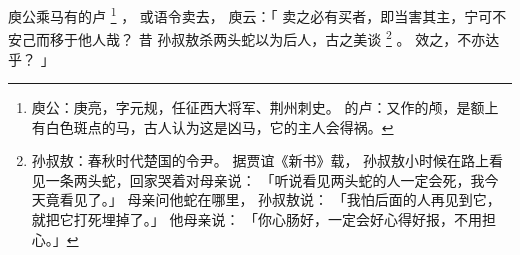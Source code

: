 
\switchcolumn*[\section{}]

庾公乘马有的卢%
\footnote{%
    庾公：庚亮，字元规，任征西大将军、荆州刺史。
    的卢：又作的颅，是额上有白色斑点的马，古人认为这是凶马，它的主人会得祸。
}%
，
或语令卖去，
庾云：「
    卖之必有买者，即当害其主，宁可不安己而移于他人哉？
    昔
    孙叔敖杀两头蛇以为后人，古之美谈%
    \footnote{%
        孙叔敖：春秋时代楚国的令尹。
                据贾谊《新书》载，
                孙叔敖小时候在路上看见一条两头蛇，回家哭着对母亲说：
                「听说看见两头蛇的人一定会死，我今天竟看见了。」
                母亲问他蛇在哪里，
                孙叔敖说：
                「我怕后面的人再见到它，就把它打死埋掉了。」
                他母亲说：
                「你心肠好，一定会好心得好报，不用担心。」
    }%
    。
    效之，不亦达乎？
」

\switchcolumn


